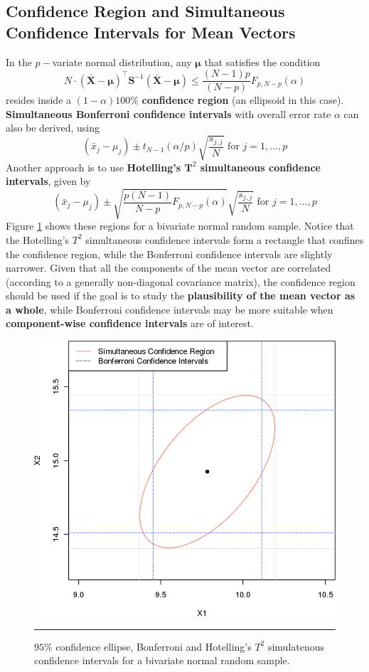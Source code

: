 \subsection[Confidence Region and Simultaneous Confidence Intervals]{Confidence Region and Simultaneous Confidence Intervals for Mean Vectors}
In the $p-$variate normal distribution, any $\bm{\mu}$ that satisfies the condition
\begin{equation}\label{eq:T2.2}
    N\cdot (\bm{\bar{X}}-\bm{\mu})^{\!\top}\bm{S}^{-1}(\bm{\bar{X}}-\bm{\mu}) \leq \frac{(N-1)p}{(N-p)}F_{p, N-p}(\alpha)
\end{equation}
resides inside a $(1-\alpha)100\%$ \textbf{confidence region} (an ellipsoid in this case). \textbf{Simultaneous Bonferroni confidence intervals} with overall error rate $\alpha$ can also be derived, using 
\begin{equation*}
    (\bar{x}_{j}-\mu_{j})\pm t_{N-1}(\alpha/p)\sqrt{\frac{s_{j,j}}{N}} \text{ for $j=1,\ldots, p$}
\end{equation*}
\newpage\noindent Another approach is to use \textbf{Hotelling's $\bm{T}^2$ simultaneous confidence intervals}, given by 
\begin{equation*}
    (\bar{x}_{j}-\mu_{j})\pm \sqrt{\frac{p(N-1)}{N-p}F_{p,N-p}(\alpha)} \sqrt{\frac{s_{j,j}}{N}} \text{ for $j=1,\ldots, p$}
\end{equation*}
Figure \ref{fig:testA7} shows these regions for a bivariate normal random sample. Notice that the Hotelling's ${T}^{2}$ simultaneous confidence intervals form a rectangle that confines the confidence region, while the Bonferroni confidence intervals are slightly narrower. Given that all the components of the mean vector are correlated (according to a generally non-diagonal covariance matrix), the confidence region should be used if the goal is to study the \textbf{plausibility of the mean vector as a whole}, while Bonferroni confidence intervals may be more suitable when \textbf{component-wise confidence intervals} are of interest. 

\begin{figure}[!t]
\centering
  \includegraphics[width=0.5\linewidth]{Images/testA7.png}
  \caption[\small Confidence regions, Bonferroni and Hotelling simultaneous confidence intervals]{\small $95\%$ confidence ellipse, Bonferroni and Hotelling's ${T}^{2}$ simulatenous confidence intervals for a bivariate normal random sample.}
  \label{fig:testA7}\hrule
\end{figure}
\afterpage{\FloatBarrier}

